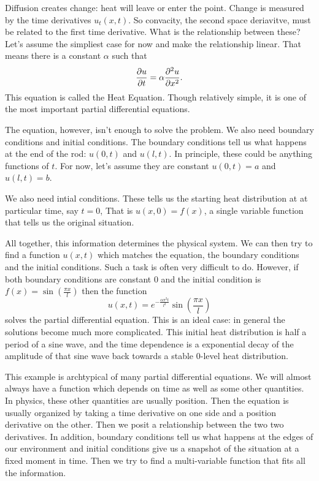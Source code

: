 \documentclass[fleqn,letterpaper]{report}
\begin{document}
Diffusion creates change: heat will leave or enter the point.
Change is measured by the time derivatives $u_t(x,t)$. So
convacity, the second space deriavitve, must be related to the
first time derivative. What is the relationship between these?
Let's assume the simpliest case for now and make the
relationship linear. That means there is a constant $\alpha$
such that 
\begin{equation*} 
\frac{\partial u}{\partial t} = \alpha \frac{\partial^2 u}{\partial x^2}.  
\end{equation*} 
This equation is called the Heat Equation. Though relatively
simple, it is one of the most important partial differential
equations.

The equation, however, isn't enough to solve the problem. We
also need boundary conditions and initial conditions. The
boundary conditions tell us what happens at the end of the
rod: $u(0,t)$ and $u(l,t)$. In principle, these could be
anything functions of $t$. For now, let's assume they are
constant $u(0,t) = a$ and $u(l,t) = b$. 

We also need intial conditions. These tells us the starting
heat distribution at at particular time, say $t=0$, That is
$u(x,0) = f(x)$, a single variable function that tells us the
original situation. 

All together, this information determines the physical system.
We can then try to find a function $u(x,t)$ which matches the
equation, the boundary conditions and the initial conditions.
Such a task is often very difficult to do. However, if both
boundary conditions are constant $0$ and the initial condition
is $f(x) = \sin \left( \frac{\pi x}{l} \right)$ then the
function 
\begin{equation*}
u(x,t) = e^{-\frac{\alpha \pi^2 t}{l^2}} \sin \left( \frac{\pi
x}{l} \right)
\end{equation*}
solves the partial differential equation. This is an ideal
case: in general the solutions become much more complicated.
This initial heat distribution is half a period of a sine wave,
and the time dependence is a exponential decay of the
amplitude of that sine wave back towards a stable 0-level heat
distribution.

This example is archtypical of many partial differential
equations. We will almost always have a function which
depends on time as well as some other quantities. In physics,
these other quantities are usually position. Then the
equation is usually organized by taking a time derivative on
one side and a position derivative on the other. Then we posit
a relationship between the two two derivatives. In addition,
boundary conditions tell us what happens at the edges of our
environment and initial conditions give us a snapshot of the
situation at a fixed moment in time. Then we try to find a
multi-variable function that fits all the information.
\end{document}
